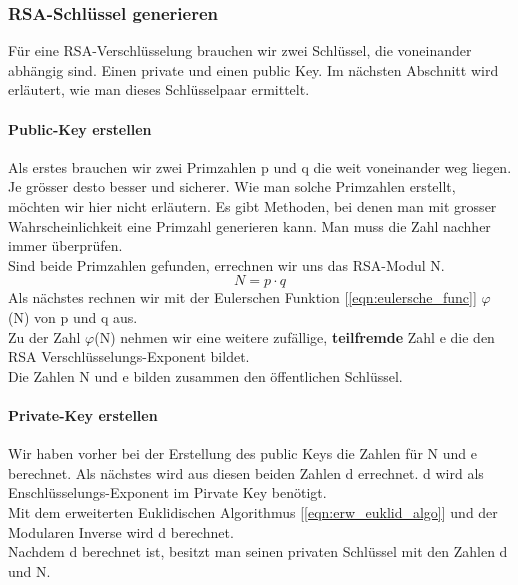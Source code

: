 \subsubsection{RSA-Schlüssel generieren}
Für eine RSA-Verschlüsselung brauchen wir zwei Schlüssel, die voneinander abhängig sind. Einen private und einen public Key. Im nächsten Abschnitt wird erläutert, wie man dieses Schlüsselpaar ermittelt.%
%
\paragraph{Public-Key erstellen}\label{sec:public_key}
Als erstes brauchen wir zwei Primzahlen p und q die weit voneinander weg liegen. Je grösser desto besser und sicherer. Wie man solche Primzahlen erstellt, möchten wir hier nicht erläutern. Es gibt Methoden, bei denen man mit grosser Wahrscheinlichkeit eine Primzahl generieren kann. Man muss die Zahl nachher immer überprüfen.\\
Sind beide Primzahlen gefunden, errechnen wir uns das RSA-Modul N. %
%
\begin{equation}
  N = p \cdot q
  \label{eqn:rsa_modul}
\end{equation}
%
Als nächstes rechnen wir mit der Eulerschen Funktion [\ref{eqn:eulersche_func}] $\varphi$(N) von p und q aus.\\
Zu der Zahl $\varphi$(N) nehmen wir eine weitere zufällige, \textbf{teilfremde} Zahl e die den RSA Verschlüsselungs-Exponent bildet.\\
Die Zahlen N und e bilden zusammen den öffentlichen Schlüssel.
\paragraph{Private-Key erstellen}
Wir haben vorher bei der Erstellung des public Keys die Zahlen für N und e berechnet. Als nächstes wird aus diesen beiden Zahlen d errechnet. d wird als Enschlüsselungs-Exponent im Pirvate Key benötigt.\\
Mit dem erweiterten Euklidischen Algorithmus [\ref{eqn:erw_euklid_algo}] und der Modularen Inverse wird d berechnet.\\
%
%
Nachdem d berechnet ist, besitzt man seinen privaten Schlüssel mit den Zahlen d und N.

